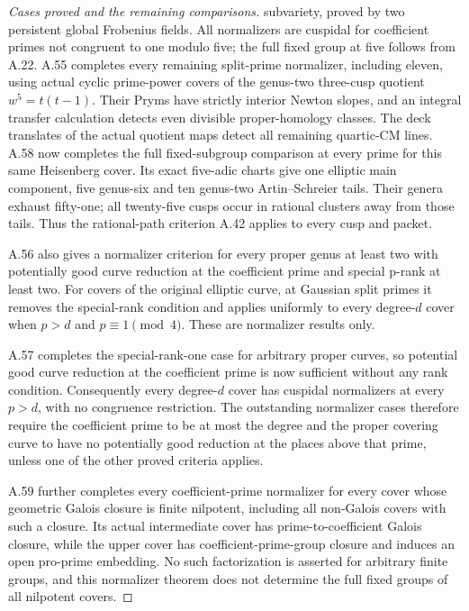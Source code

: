 \begin{proof}[Cases proved and the remaining comparisons]
subvariety, proved by two persistent global Frobenius fields. All
normalizers are cuspidal for coefficient primes not congruent to one
modulo five; the full fixed group at five follows from A.22.
A.55 completes every remaining split-prime normalizer, including
eleven, using actual cyclic prime-power covers of the genus-two
three-cusp quotient \(w^5=t(t-1)\). Their Pryms have strictly
interior Newton slopes, and an integral transfer calculation detects
even divisible proper-homology classes. The deck translates of
the actual quotient maps detect all remaining quartic-CM lines.
A.58 now completes the full fixed-subgroup comparison at every prime
for this same Heisenberg cover. Its exact five-adic charts give one
elliptic main component, five genus-six and ten genus-two
Artin--Schreier tails. Their genera exhaust fifty-one; all twenty-five
cusps occur in rational clusters away from those tails. Thus the
rational-path criterion A.42 applies to every cusp and packet.

A.56 also gives a normalizer criterion for every proper genus at least two
with potentially good curve reduction at the coefficient prime and
special p-rank at least two. For covers of the original elliptic curve,
at Gaussian split primes it removes the special-rank condition and applies
uniformly to every degree-\(d\) cover when \(p>d\) and
\(p\equiv1\pmod4\). These are normalizer results only.

A.57 completes the special-rank-one case for arbitrary proper curves,
so potential good curve reduction at the coefficient prime is now
sufficient without any rank condition. Consequently every degree-\(d\)
cover has cuspidal normalizers at every \(p>d\), with no congruence
restriction. The outstanding normalizer cases therefore require the
coefficient prime to be at most the degree and the proper covering curve
to have no potentially good reduction at the places above that prime,
unless one of the other proved criteria applies.


A.59 further completes every coefficient-prime normalizer for
every cover whose geometric Galois closure is finite nilpotent,
including all non-Galois covers with such a closure. Its actual
intermediate cover has prime-to-coefficient Galois closure, while
the upper cover has coefficient-prime-group closure and induces
an open pro-prime embedding. No such factorization is asserted
for arbitrary finite groups, and this normalizer theorem does
not determine the full fixed groups of all nilpotent covers.



\end{proof}
